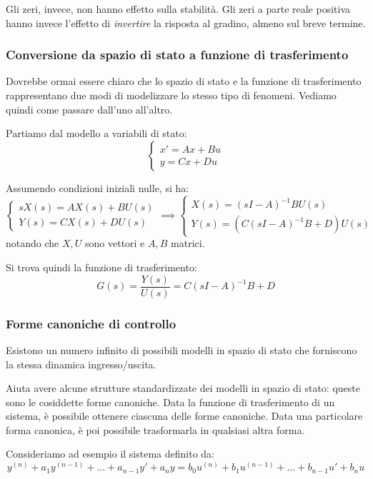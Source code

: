 \documentclass[a4paper,11pt]{article}
\begin{document}
Gli zeri, invece, non hanno effetto sulla stabilità.
Gli zeri a parte reale positiva hanno invece l'effetto di \textit{invertire} la risposta al gradino, almeno sul breve termine.

\subsubsection{Conversione da spazio di stato a funzione di trasferimento}
Dovrebbe ormai essere chiaro che lo spazio di stato e la funzione di trasferimento rappresentano due modi di modelizzare lo stesso tipo di fenomeni.
Vediamo quindi come passare dall'uno all'altro.

Partiamo dal modello a variabili di stato:
\[
	\begin{cases}
		x' = Ax + Bu \\
		y = Cx + Du
	\end{cases}
\]

Assumendo condizioni iniziali nulle, si ha:
\[
	\begin{cases}
		s X(s) = A X(s) + B U(s)  \\ 
		Y(s) = C X(s) + D U(s) 
	\end{cases} \implies
	\begin{cases}
		X(s) = (sI - A)^{-1} B U(s) \\
		Y(s) = \left( C(sI - A)^{-1} B + D \right) U(s)
	\end{cases}
\]
notando che $X, U$ sono vettori e $A, B$ matrici.

Si trova quindi la funzione di trasferimento:
$$
G(s) = \frac{Y(s)}{U(s)} = C(sI - A)^{-1} B + D
$$

\subsubsection{Forme canoniche di controllo}
Esistono un numero infinito di possibili modelli in spazio di stato che forniscono la stessa dinamica ingresso/uscita.

Aiuta avere alcune strutture standardizzate dei modelli in spazio di stato: queste sono le cosiddette forme canoniche.
Data la funzione di trasferimento di un sistema, è possibile ottenere ciascuna delle forme canoniche.
Data una particolare forma canonica, è poi possibile trasformarla in qualsiasi altra forma.

Consideriamo ad esempio il sistema definito da:
$$
y^{(n)} + a_1 y^{(n - 1)} + ... + a_{n - 1}y' + a_n y = b_0 u^{(n)} + b_1 u^{(n - 1)} + ... + b_{n - 1} u' + b_nu
$$
\end{document}
